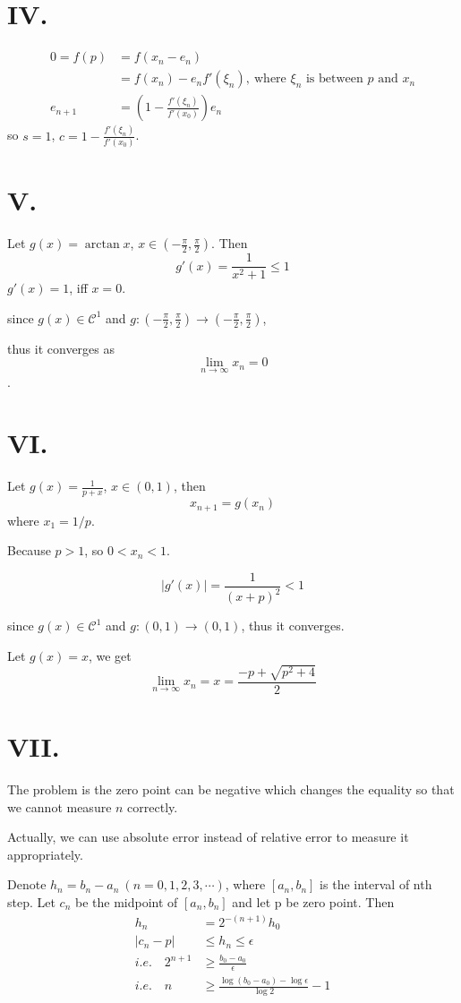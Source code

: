 \documentclass[a4paper]{article}
\begin{document}
\section*{IV.}
$$
\begin{aligned}
  0=f(p)&=f(x_{n}-e_{n}) \\
  &=f(x_{n})-e_{n}f'(\xi_{n}),\  \text{where $\xi_{n}$ is between $p$ and $x_{n}$} \\
  e_{n+1}&=(1-\frac{f'(\xi_{n})}{f'(x_{0})})e_{n}
\end{aligned}
$$
so $s=1$, $c=1-\frac{f'(\xi_{n})}{f'(x_{0})}$.

\section*{V.}
Let $g(x)=\arctan x$, $x\in (-\frac{\pi}{2},\frac{\pi}{2})$. Then
$$g'(x)=\frac{1}{x^{2}+1}\leq 1$$
$g'(x)= 1$, iff $x=0$.

since $g(x)\in \mathcal{C}^1$ and $g:(-\frac{\pi}{2},\frac{\pi}{2})\rightarrow(-\frac{\pi}{2},\frac{\pi}{2})$,

thus it converges as $$\lim_{n\rightarrow \infty} x_{n}=0$$.


\section*{VI.}
Let $g(x)=\frac{1}{p+x}$, $x\in(0,1)$, then
$$x_{n+1}=g(x_{n})$$
where $x_{1}=1/p$.

Because $p>1$,
so $0< x_{n} < 1$.

$$\lvert g'(x) \rvert=\frac{1}{(x+p)^{2}}<1$$

since $g(x)\in \mathcal{C}^1$ and $g:(0,1)\rightarrow(0,1)$,
thus it converges.

Let $g(x)=x$, we get $$\lim_{n\rightarrow\infty} x_{n}= x=\frac{-p+\sqrt{p^{2}+4}}{2}$$


\section*{VII.}
The problem is the zero point can be negative which changes the equality so that we cannot measure $n$ correctly.

Actually, we can use absolute error instead of relative error to measure it appropriately.

Denote $h_{n}=b_{n}-a_{n}\ (n=0,1,2,3,\cdots)$, where $[a_{n},b_{n}]$ is the interval of nth step. 
Let $c_n$ be the midpoint of $[a_{n},b_{n}]$ and let p be zero point. Then
$$
\begin{aligned}
  h_{n}&=2^{-(n+1)}h_{0} \\
  \lvert c_{n}-p \rvert &\leq h_{n} \leq \epsilon \\
  i.e.\quad 2^{n+1} &\geq \frac{b_{0}-a_{0}}{\epsilon} \\
  i.e.\quad n &\geq \frac{\log(b_{0}-a_{0})-\log\epsilon}{\log2}-1 
\end{aligned}
$$
\end{document}
